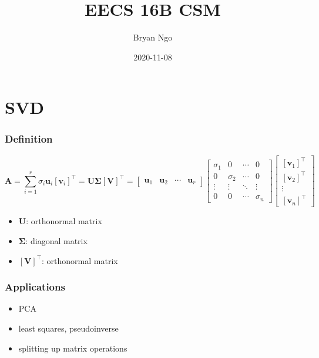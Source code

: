 \documentclass[aspectratio=169]{beamer}
\title{EECS 16B CSM}
\author{Bryan Ngo}
\date{2020-11-08}
\institute{UC Berkeley}
\newcommand{\tpose}[1]{\left[#1\right]^{\! \top} \!\!}
\begin{document}
\begin{frame}
    \maketitle
\end{frame}

\section{SVD}

\begin{frame}
    \frametitle{Definition}

    \begin{equation}
        \bm{A} = \sum_{i = 1}^r \sigma_i \bm{u}_i \tpose{\bm{v}_i} = \bm{U \Sigma} \tpose{\bm{V}} =
        \begin{bmatrix}
            \bm{u}_1 & \bm{u}_2 & \cdots & \bm{u}_r
        \end{bmatrix}
        \begin{bmatrix}
            \sigma_1 & 0 & \cdots & 0 \\
            0 & \sigma_2 & \cdots & 0 \\
            \vdots & \vdots & \ddots & \vdots \\
            0 & 0 & \cdots & \sigma_n
        \end{bmatrix}
        \begin{bmatrix}
            \tpose{\bm{v}_1} \\
            \tpose{\bm{v}_2} \\
            \vdots \\
            \tpose{\bm{v}_n}
        \end{bmatrix}
    \end{equation}
    \begin{itemize}
        \item \(\bm{U}\): orthonormal matrix
        \item \(\bm{\Sigma}\): diagonal matrix
        \item \(\tpose{\bm{V}}\): orthonormal matrix
    \end{itemize}
\end{frame}

\begin{frame}
    \frametitle{Applications}

    \begin{itemize}
        \item PCA
        \item least squares, pseudoinverse
        \item splitting up matrix operations
    \end{itemize}
\end{frame}
\end{document}
